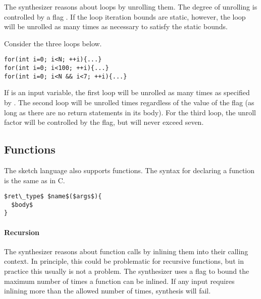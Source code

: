 The synthesizer reasons about loops by unrolling them. The degree of unrolling is controlled by a flag . If the loop iteration bounds are static, however, the loop will be unrolled as many times as necessary to satisfy the static bounds. 



\begin{Example}
Consider the three loops below.
\begin{lstlisting}
for(int i=0; i<N; ++i){...}
for(int i=0; i<100; ++i){...}
for(int i=0; i<N && i<7; ++i){...}
\end{lstlisting}
If  is an input variable, the first loop will be unrolled as many times as specified by . The second loop will be unrolled  times regardless of the value of the flag (as long as there are no return statements in its body). For the third loop, the unroll factor will be controlled by the flag, but will never exceed seven.
\end{Example}



\subsection{Functions}
The sketch language also supports functions. The syntax for declaring a function is the same as in C. 

\begin{lstlisting}
$ret\_type$ $name$($args$){
  $body$
}
\end{lstlisting}

\paragraph{Recursion}
The synthesizer reasons about function calls by inlining them into their calling context. In principle, this could be problematic for recursive functions, but in practice this usually is not a problem. The synthesizer uses a flag  to bound the maximum number of times a function can be inlined. If any input requires inlining more than the allowed number of times, synthesis will fail.


